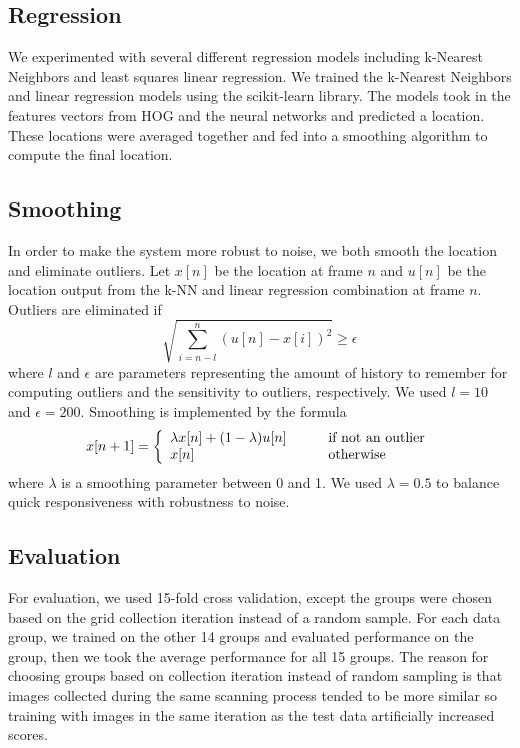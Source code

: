 \documentclass[10pt,twocolumn,letterpaper]{article}
\begin{document}
\subsection{Regression}
We experimented with several different regression models including k-Nearest Neighbors and least squares linear regression.  We trained the k-Nearest Neighbors and linear regression models using the scikit-learn library\cite{scikit-learn}.  The models took in the features vectors from HOG and the neural networks and predicted a location. These locations were averaged together and fed into a smoothing algorithm to compute the final location.

\subsection{Smoothing}
In order to make the system more robust to noise, we both smooth the location and eliminate outliers. Let $x[n]$ be the location at frame $n$ and $u[n]$ be the location output from the k-NN and linear regression combination at frame $n$. Outliers are eliminated if
\begin{equation}
	\sqrt{\sum_{i=n-l}^{n}(u[n]-x[i])^2} \geq \epsilon
\end{equation}
where $l$ and $\epsilon$ are parameters representing the amount of history to remember for computing outliers and the sensitivity to outliers, respectively. We used $l=10$ and $\epsilon=200$. Smoothing is implemented by the formula 
\begin{equation}
	x[n+1] = \left\{
		\begin{array}{l l}
			\lambda x[n] + (1-\lambda)u[n] & \qquad \text{if not an outlier} \\
			x[n] & \qquad \text{otherwise}
		\end{array}
	\right.
\end{equation}
 where $\lambda$ is a smoothing parameter between 0 and 1. We used $\lambda=0.5$ to balance quick responsiveness with robustness to noise.
 
\subsection{Evaluation}
For evaluation, we used 15-fold cross validation, except the groups were chosen based on the grid collection iteration instead of a random sample.  For each data group, we trained on the other 14 groups and evaluated performance on the group, then we took the average performance for all 15 groups.  The reason for choosing groups based on collection iteration instead of random sampling is that images collected during the same scanning process tended to be more similar so training with images in the same iteration as the test data artificially increased scores.
\end{document}
